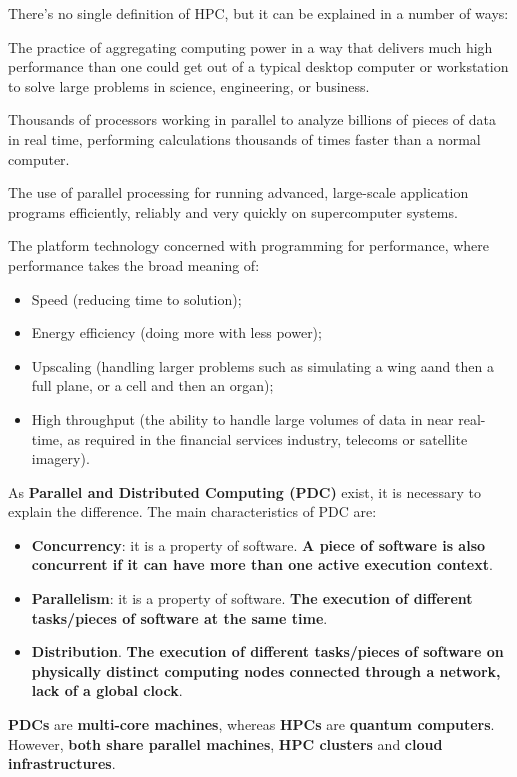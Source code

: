 \documentclass[a4paper]{article}
\newcommand{\definition}[1]{\textcolor{Red3}{\textbf{#1}}\index{#1}}
\newcommand{\highspace}{\vspace{1.2em}\noindent}
\begin{document}
    There's no single definition of HPC, but it can be explained in a number of ways:
    \begin{definitionbox}
        The practice of aggregating computing power in a way that delivers much high performance than one could get out of a typical desktop computer or workstation to solve large problems in science, engineering, or business.

        \highspace
        Thousands of processors working in parallel to analyze billions of pieces of data in real time, performing calculations thousands of times faster than a normal computer.

        \highspace
        The use of parallel processing for running advanced, large-scale application programs efficiently, reliably and very quickly on supercomputer systems.

        \highspace
        The platform technology concerned with programming for performance, where performance takes the broad meaning of:
        \begin{itemize}
            \item Speed (reducing time to solution);
            \item Energy efficiency (doing more with less power);
            \item Upscaling (handling larger problems such as simulating a wing aand then a full plane, or a cell and then an organ);
            \item High throughput (the ability to handle large volumes of data in near real-time, as required in the financial services industry, telecoms or satellite imagery).
        \end{itemize}
    \end{definitionbox}

    \noindent
    As \definition{Parallel and Distributed Computing (PDC)} exist, it is necessary to explain the difference. The main characteristics of PDC are:
    \begin{itemize}
        \item \textbf{Concurrency}: it is a property of software. \textbf{A piece of software is also concurrent if it can have more than one active execution context}.

        \item \textbf{Parallelism}: it is a property of software. \textbf{The execution of different tasks/pieces of software at the same time}.

        \item \textbf{Distribution}. \textbf{The execution of different tasks/pieces of software on physically distinct computing nodes connected through a network, lack of a global clock}.
    \end{itemize}
    \textbf{PDCs} are \textbf{multi-core machines}, whereas \textbf{HPCs} are \textbf{quantum computers}. However, \textbf{both share parallel machines}, \textbf{HPC clusters} and \textbf{cloud infrastructures}.
\end{document}
